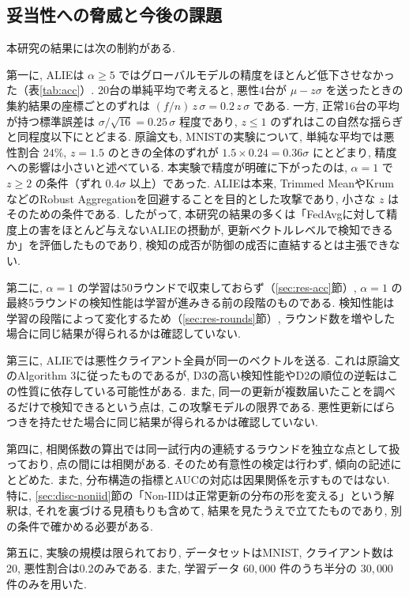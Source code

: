\documentclass[a4j, twocolumn, dvipdfmx]{jsarticle}
\begin{document}
\subsection{妥当性への脅威と今後の課題}
\label{sec:disc-threats}

本研究の結果には次の制約がある.

第一に, ALIEは $\alpha \ge 5$ ではグローバルモデルの精度をほとんど低下させなかった（表\ref{tab:acc}）. 20台の単純平均で考えると, 悪性4台が $\mu - z\sigma$ を送ったときの集約結果の座標ごとのずれは $(f/n)\,z\,\sigma = 0.2\,z\,\sigma$ である. 一方, 正常16台の平均が持つ標準誤差は $\sigma/\sqrt{16} = 0.25\,\sigma$ 程度であり, $z \le 1$ のずれはこの自然な揺らぎと同程度以下にとどまる. 原論文も, MNISTの実験について, 単純な平均では悪性割合 $24\%$, $z=1.5$ のときの全体のずれが $1.5 \times 0.24 = 0.36\sigma$ にとどまり, 精度への影響は小さいと述べている\cite{baruch2019little}. 本実験で精度が明確に下がったのは, $\alpha=1$ で $z \ge 2$ の条件（ずれ $0.4\sigma$ 以上）であった. ALIEは本来, Trimmed MeanやKrumなどのRobust Aggregationを回避することを目的とした攻撃であり\cite{baruch2019little}, 小さな $z$ はそのための条件である. したがって, 本研究の結果の多くは「FedAvgに対して精度上の害をほとんど与えないALIEの摂動が, 更新ベクトルレベルで検知できるか」を評価したものであり, 検知の成否が防御の成否に直結するとは主張できない.

第二に, $\alpha=1$ の学習は50ラウンドで収束しておらず（\ref{sec:res-acc}節）, $\alpha=1$ の最終5ラウンドの検知性能は学習が進みきる前の段階のものである. 検知性能は学習の段階によって変化するため（\ref{sec:res-rounds}節）, ラウンド数を増やした場合に同じ結果が得られるかは確認していない.

第三に, ALIEでは悪性クライアント全員が同一のベクトルを送る. これは原論文のAlgorithm 3に従ったものであるが, D3の高い検知性能やD2の順位の逆転はこの性質に依存している可能性がある. また, 同一の更新が複数届いたことを調べるだけで検知できるという点は, この攻撃モデルの限界である. 悪性更新にばらつきを持たせた場合に同じ結果が得られるかは確認していない.

第四に, 相関係数の算出では同一試行内の連続するラウンドを独立な点として扱っており, 点の間には相関がある. そのため有意性の検定は行わず, 傾向の記述にとどめた. また, 分布構造の指標とAUCの対応は因果関係を示すものではない. 特に, \ref{sec:disc-noniid}節の「Non-IIDは正常更新の分布の形を変える」という解釈は, それを裏づける見積もりも含めて, 結果を見たうえで立てたものであり, 別の条件で確かめる必要がある.

第五に, 実験の規模は限られており, データセットはMNIST, クライアント数は20, 悪性割合は0.2のみである. また, 学習データ $60{,}000$ 件のうち半分の $30{,}000$ 件のみを用いた.
\end{document}
